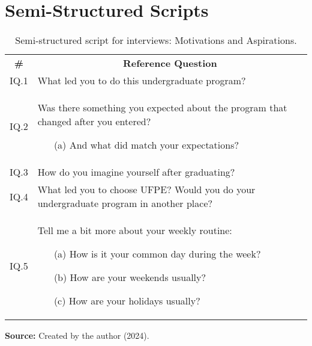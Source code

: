 \chapter{Semi-Structured Scripts}
\label{chap:appendix-scripts}

\begin{table}[ht]
\caption{Semi-structured script for interviews: Motivations and Aspirations.}
\label{tbl:motivation-aspiration-script}
\centering
{}
\begin{tabular}{p{1cm}p{12.5cm}}
\hline
\multicolumn{1}{c}{\textbf{\#}} & \multicolumn{1}{c}{\textbf{Reference Question}}\\
\multicolumn{1}{c}{IQ.1} &
What led you to do this undergraduate program?\\
\multicolumn{1}{c}{IQ.2} &
Was there something you expected about the program that changed after you entered?
\begin{enumerate}
    \item[(a)] And what did match your expectations?
\end{enumerate}\\
\multicolumn{1}{c}{IQ.3} &
How do you imagine yourself after graduating?\\
\multicolumn{1}{c}{IQ.4} &
What led you to choose \gls{UFPE}? 
Would you do your undergraduate program in another place?\\
\multicolumn{1}{c}{IQ.5} &
Tell me a bit more about your weekly routine:
\begin{enumerate}
    \item[(a)] How is it your common day during the week?
    \item[(b)] How are your weekends usually?
    \item[(c)] How are your holidays usually? 
\end{enumerate}\\
\hline

\end{tabular}

  \par\medskip\ABNTEXfontereduzida\selectfont\textbf{Source:} Created by the author (2024). \par\medskip
\end{table}

